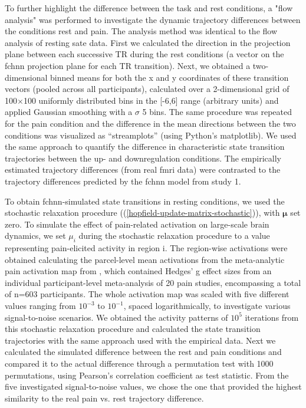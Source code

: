 \documentclass{article}
\begin{document}
To further highlight the difference between the task and rest conditions, a "flow analysis" was performed to investigate the dynamic trajectory differences between the conditions rest and pain. The analysis method was identical to the flow analysis of resting sate data. First we calculated the direction in the projection plane between each successive TR during the rest conditions (a vector on the \acrshort{fchnn} projection plane for each TR transition). Next, we obtained a two-dimensional binned means for both the x and y coordinates of these transition vectors (pooled across all participants), calculated over a 2-dimensional grid of 100$\times$100 uniformly distributed bins in the [-6,6] range (arbitrary units) and applied Gaussian smoothing with a $\sigma$ 5 bins.
The same procedure was repeated for the pain condition and the difference in the mean directions between the two conditions was visualized as ``streamplots'' (using Python's matplotlib). We used the same approach to quantify the difference in characteristic state transition trajectories between the up- and downregulation conditions. The empirically estimated trajectory differences (from real \acrshort{fmri} data) were contrasted to the trajectory differences predicted by the \acrshort{fchnn} model from study 1.

To obtain \acrshort{fchnn}-simulated state transitions in resting conditions, we used the stochastic relaxation procedure ((\ref{hopfield-update-matrix-stochastic})), with $\mathbf{\mu}$ set zero.
To simulate the effect of pain-related activation on large-scale brain dynamics, we set $\mu_i$ during the stochastic relaxation procedure to a value representing pain-elicited activity in region i. The region-wise activations were obtained calculating the parcel-level mean activations from the meta-analytic pain activation map from \citep{zunhammer2021meta}, which contained Hedges' g effect sizes from an individual participant-level meta-analysis of 20 pain studies, encompassing a total of n=603 participants. The whole activation map was scaled with five different values ranging from $10^{ -3}$ to $10^{ -1}$, spaced logarithmically, to investigate various signal-to-noise scenarios.
We obtained the activity patterns of $10^5$ iterations from this stochastic relaxation procedure and calculated the state transition trajectories with the same approach used with the empirical data.
Next we calculated the simulated difference between the rest and pain conditions and compared it to the actual difference through a permutation test with 1000 permutations, using Pearson's correlation coefficient as test statistic.
From the five investigated signal-to-noise values, we chose the one that provided the highest similarity to the real pain vs. rest trajectory difference.
\end{document}
